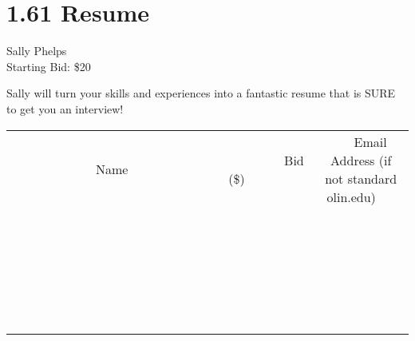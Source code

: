 \documentclass[11pt]{article}
\begin{document}
\section*{1.61 Resume}
Sally Phelps
\\
Starting Bid: \$20
\newline

Sally will turn your skills and experiences into a fantastic resume that is SURE to get you an interview!
\\[6ex]
\begin{tabular}{c c c}
~~~~~~~~~~~~~Name~~~~~~~~~~~~~ & ~~~~~~~~~Bid (\$)~~~~~~~~~  & ~~~Email Address (if not standard olin.edu)~~~\\
 & & \\
\hline
 & & \\
\hline
 & & \\
\hline
 & & \\
\hline
 & & \\
\hline
 & & \\
\hline
 & & \\
\hline
 & & \\
\hline
 & & \\
\hline
 & & \\
\hline
 & & \\
\hline
 & & \\
\hline
 & & \\
\hline
 & & \\
\hline
 & & \\
\hline
 & & \\
\hline
 & & \\
\hline
 & & \\
\hline
 & & \\
\hline
 & & \\
\hline
 & & \\
\hline
 & & \\
\hline
 & & \\
\hline
 & & \\
\hline
 & & \\
\hline
 & & \\
\hline
\end{tabular}
\newpage
\end{document}
